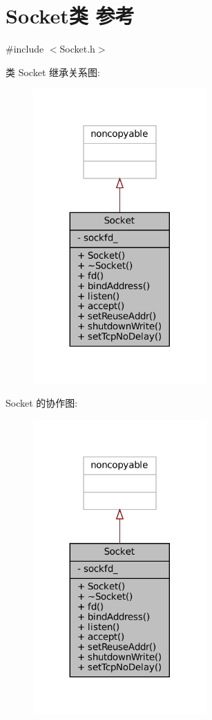 \hypertarget{classmuduo_1_1Socket}{}\section{Socket类 参考}
\label{classmuduo_1_1Socket}


{\ttfamily \#include $<$Socket.\+h$>$}



类 Socket 继承关系图\+:
\nopagebreak
\begin{figure}[H]
\begin{center}
\leavevmode
\includegraphics[width=188pt]{classmuduo_1_1Socket__inherit__graph}
\end{center}
\end{figure}


Socket 的协作图\+:
\nopagebreak
\begin{figure}[H]
\begin{center}
\leavevmode
\includegraphics[width=188pt]{classmuduo_1_1Socket__coll__graph}
\end{center}
\end{figure}
